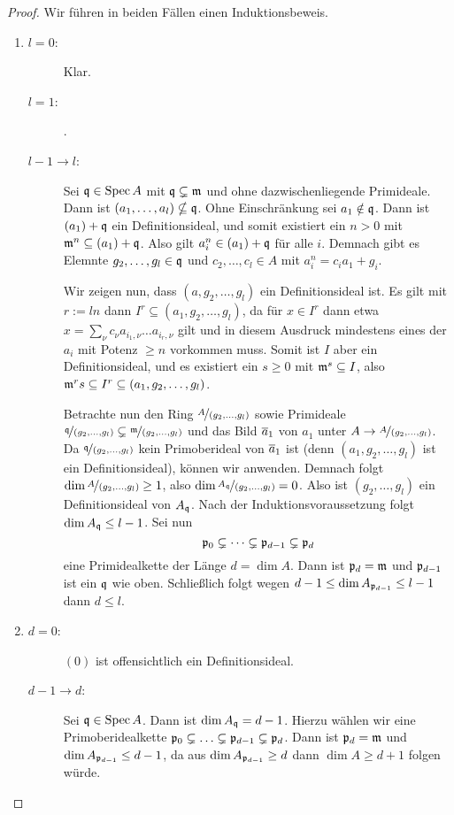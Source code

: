 \documentclass[12pt,a4paper]{scrartcl}
\theoremstyle{cplain}
\theoremstyle{cdef}
\begin{document}
\begin{proof}
	Wir führen in beiden Fällen einen Induktionsbeweis.
	\begin{enumerate}[label=\ref{thm:9.13:\roman*}]
		\item \begin{description}
			\item[$l = 0$:] Klar.
			\item[$l = 1$:] .
			\item[$l-1\to l$:] Sei $\mathfrak{q}\in \operatorname{Spec} A$ mit $\mathfrak{q} \subsetneq \mathfrak{m}$ und ohne dazwischenliegende Primideale. Dann ist $(a_1,\dots, a_l)\nsubseteq \mathfrak{q}$. Ohne Einschränkung sei $a_1\notin \mathfrak{q}$. Dann ist $(a_1)+\mathfrak{q}$ ein Definitionsideal, und somit existiert ein $n>0$ mit $\mathfrak{m}^n \subseteq (a_1)+\mathfrak{q}$. Also gilt $a_i^n \in (a_1)+\mathfrak{q}$ für alle $i$. Demnach gibt es Elemnte $g_2,\dots, g_l\in\mathfrak{q}$ und $c_2,\dots, c_l\in A$ mit $a_i^n = c_ia_1+g_i$.
			
			Wir zeigen nun, dass $(a, g_2,\dots, g_l)$ ein Definitionsideal ist. Es gilt mit $r := ln$ dann $I^r \subseteq (a_1,g_2,\ldots,g_l)$, da für $x \in I^r$ dann etwa $x= \sum_\nu c_\nu a_{i_1,\nu}\ldots a_{i_r,\nu}$ gilt und in diesem Ausdruck mindestens eines der $a_i$ mit Potenz $\ge n$ vorkommen muss. Somit ist $I$ aber ein Definitionsideal, und es existiert ein $s \ge 0$ mit $\mathfrak{m}^s \subseteq I$, also $\mathfrak{m}^rs \subseteq I^r \subseteq (a_1,g_2,\ldots,g_l)$.
			
			Betrachte nun den Ring $\nicefrac{A}{(g_2,\dots, g_l)}$ sowie Primideale $\nicefrac{\mathfrak{q}}{(g_2,\dots, g_l)}\subsetneq \nicefrac{\mathfrak{m}}{(g_2,\dots, g_l)}$ und das Bild $\overline a_1$ von $a_1$ unter $A\to \nicefrac{A}{(g_2,\dots, g_l)}$. Da $\nicefrac{\mathfrak{q}}{(g_2,\dots, g_l)}$ kein Primoberideal von $\overline a_1$ ist (denn $(a_1,g_2,\dots, g_l)$ ist ein Definitionsideal), können wir  anwenden. Demnach folgt $\dim \nicefrac{A}{(g_2,\dots, g_l)}\ge 1$, also $\dim \nicefrac{A_{\mathfrak{q}}}{(g_2,\dots, g_l)} = 0$. Also ist $(g_2,\dots, g_l)$ ein Definitionsideal von $A_{\mathfrak{q}}$. Nach der Induktionsvoraussetzung folgt $\dim A_{\mathfrak{q}}\le l-1$. Sei nun \[\mathfrak{p}_0\subsetneq \dots \subsetneq \mathfrak{p}_{d-1}\subsetneq\mathfrak{p}_d\] eine Primidealkette der Länge $d = \dim A$. Dann ist $\mathfrak{p}_d = \mathfrak{m}$ und $\mathfrak{p}_{d-1}$ ist ein $\mathfrak{q}$ wie oben. Schließlich folgt wegen $d-1\le \dim A_{\mathfrak{p}_{d-1}} \le l-1$ dann $d\le l$.
		\end{description}
		\item \begin{description}
			\item[$d = 0$:] $(0)$ ist offensichtlich ein Definitionsideal.
			\item[$d-1 \rightarrow d$:] Sei $\mathfrak{q}\in \operatorname{Spec} A$. Dann ist $\dim A_{\mathfrak{q}} = d-1$. Hierzu wählen wir eine Primoberidealkette $\mathfrak{p}_0 \subsetneq \ldots \subsetneq \mathfrak{p}_{d-1} \subsetneq \mathfrak{p}_d$. Dann ist $\mathfrak{p}_d = \mathfrak{m}$ und $\dim A_{\mathfrak{p}_{d-1}} \le d-1$, da aus $\dim A_{\mathfrak{p}_{d-1}}\ge d$ dann $\dim A \ge d+1$ folgen würde.
			

\end{description}
\end{enumerate}
\end{proof}
\end{document}

